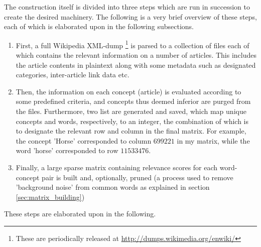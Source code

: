 The construction itself is divided into three steps which are run in succession to create the desired machinery. The following is a very brief overview of these steps, each of which is elaborated upon in the following subsections.
\begin{enumerate}
	\item First, a full Wikipedia XML-dump%
	\footnote{These are periodically released at \url{http://dumps.wikimedia.org/enwiki/}}
	is parsed to a collection of files each of which contains the relevant information on a number of articles. This includes the article contents in plaintext along with some metadata such as designated categories, inter-article link data etc.
	\item Then, the information on each concept (article) is evaluated according to some predefined criteria, and concepts thus deemed inferior are purged from the files. Furthermore, two list are generated and saved, which map unique concepts and words, respectively, to an integer, the combination of which is to designate the relevant row and column in the final matrix. For example, the concept 'Horse' corresponded to column $699221$ in my matrix, while the word 'horse' corresponded to row $11533476$.
	\item Finally, a large sparse matrix containing relevance scores for each word-concept pair is built and, optionally, pruned (a process used to remove 'background noise' from common words as explained in section \ref{sec:matrix_building})
\end{enumerate}
These steps are elaborated upon in the following.

